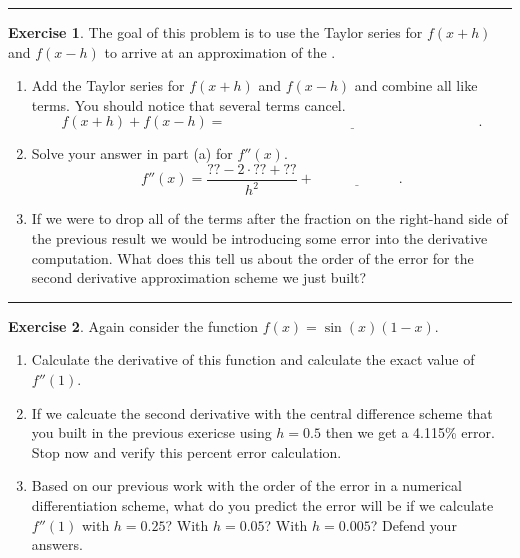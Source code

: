 \documentclass[
]{book}
\theoremstyle{definition}
\theoremstyle{definition}
\theoremstyle{definition}
\newtheorem{exercise}{Exercise}[chapter]
\theoremstyle{remark}
\begin{document}
\begin{center}\rule{0.5\linewidth}{0.5pt}\end{center}

\begin{exercise}
\protect\hypertarget{exr:unnamed-chunk-166}{}{\label{exr:unnamed-chunk-166} }The goal of
this problem is to use the Taylor series for \(f(x+h)\) and \(f(x-h)\) to
arrive at an approximation of the .

\begin{enumerate}
\def\labelenumi{\alph{enumi}.}
\item
  Add the Taylor series for \(f(x+h)\) and \(f(x-h)\) and combine all like
  terms. You should notice that several terms cancel.
  \[f(x+h) + f(x-h) = \underline{\hspace{3in}}.\]
\item
  Solve your answer in part (a) for \(f''(x)\).
  \[f''(x) = \frac{?? - 2 \cdot ?? + ??}{h^2} + \underline{\hspace{1in}}.\]
\item
  If we were to drop all of the terms after the fraction on the right-hand
  side of the previous result we would be introducing some error into the
  derivative computation. What does this tell us about the order of the error for the second derivative approximation scheme we just built?
\end{enumerate}
\end{exercise}

\begin{center}\rule{0.5\linewidth}{0.5pt}\end{center}

\begin{exercise}
\protect\hypertarget{exr:unnamed-chunk-167}{}{\label{exr:unnamed-chunk-167} }Again consider the function \(f(x) = \sin(x)(1 - x)\).

\begin{enumerate}
\def\labelenumi{\alph{enumi}.}
\item
  Calculate the derivative of this function and calculate the exact
  value of \(f''(1)\).
\item
  If we calcuate the second derivative with the central difference scheme that you built in the previous exericse using \(h = 0.5\) then we get a 4.115\% error. Stop now and verify this percent error calculation.
\item
  Based on our previous work with the order of the error in a numerical differentiation scheme, what do you predict the error will be if we calculate \(f''(1)\) with \(h = 0.25\)? With \(h = 0.05\)? With \(h = 0.005\)? Defend your answers.
\end{enumerate}
\end{exercise}
\end{document}
